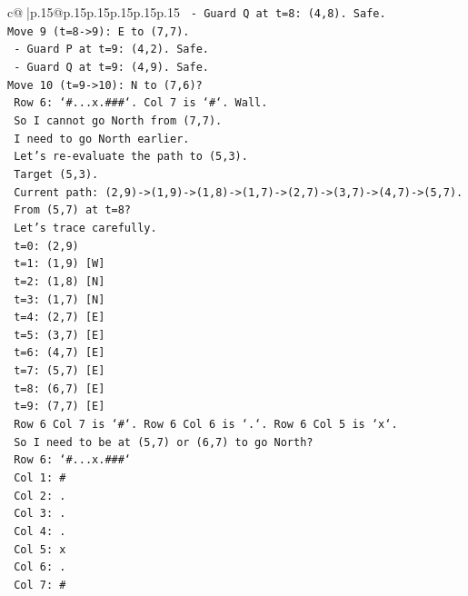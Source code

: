 \documentclass{article}
\begin{document}
{\begin{supertabular}{c@{$\;$}|p{.15\linewidth}@{}p{.15\linewidth}p{.15\linewidth}p{.15\linewidth}p{.15\linewidth}p{.15\linewidth}}
{{{\texttt{  {-} Guard Q at t=8: (4,8). Safe.} \\
\texttt{Move 9 (t=8{-}>9): E to (7,7).} \\
\texttt{  {-} Guard P at t=9: (4,2). Safe.} \\
\texttt{  {-} Guard Q at t=9: (4,9). Safe.} \\
\texttt{Move 10 (t=9{-}>10): N to (7,6)?} \\
\texttt{  Row 6: `\#...x.\#\#\#`. Col 7 is `\#`. Wall.} \\
\texttt{  So I cannot go North from (7,7).} \\
\texttt{  I need to go North earlier.} \\
\texttt{  Let's re{-}evaluate the path to (5,3).} \\
\texttt{  Target (5,3).} \\
\texttt{  Current path: (2,9){-}>(1,9){-}>(1,8){-}>(1,7){-}>(2,7){-}>(3,7){-}>(4,7){-}>(5,7).} \\
\texttt{  From (5,7) at t=8?} \\
\texttt{  Let's trace carefully.} \\
\texttt{  t=0: (2,9)} \\
\texttt{  t=1: (1,9) {[}W{]}} \\
\texttt{  t=2: (1,8) {[}N{]}} \\
\texttt{  t=3: (1,7) {[}N{]}} \\
\texttt{  t=4: (2,7) {[}E{]}} \\
\texttt{  t=5: (3,7) {[}E{]}} \\
\texttt{  t=6: (4,7) {[}E{]}} \\
\texttt{  t=7: (5,7) {[}E{]}} \\
\texttt{  t=8: (6,7) {[}E{]}} \\
\texttt{  t=9: (7,7) {[}E{]}} \\
\texttt{  Row 6 Col 7 is `\#`. Row 6 Col 6 is `.`. Row 6 Col 5 is `x`.} \\
\texttt{  So I need to be at (5,7) or (6,7) to go North?} \\
\texttt{  Row 6: `\#...x.\#\#\#`} \\
\texttt{  Col 1: \#} \\
\texttt{  Col 2: .} \\
\texttt{  Col 3: .} \\
\texttt{  Col 4: .} \\
\texttt{  Col 5: x} \\
\texttt{  Col 6: .} \\
\texttt{  Col 7: \#} \\
}}}
\end{supertabular}}
\end{document}
